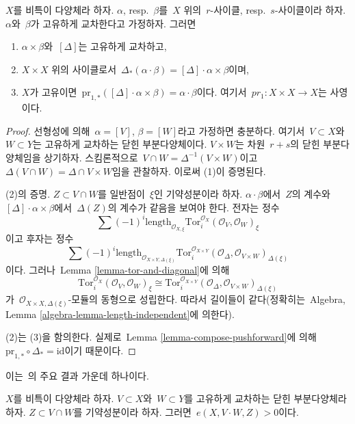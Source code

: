 \begin{lemma}
\label{lemma-reduction-diagonal}
$X$를 비특이 다양체라 하자. $\alpha$, resp.\ $\beta$를\  $X$ 위의\ 
$r$-사이클, resp.\ $s$-사이클이라 하자. $\alpha$와\  $\beta$가 고유하게
교차한다고 가정하자. 그러면
\begin{enumerate}
\item $\alpha \times \beta$와\  $[\Delta]$는 고유하게 교차하고,
\item $X \times X$ 위의 사이클로서\ 
$\Delta_*(\alpha \cdot \beta) = [\Delta] \cdot \alpha\times\beta$이며,
\item $X$가 고유이면\ 
$\text{pr}_{1, *}([\Delta] \cdot \alpha\times\beta) = \alpha\cdot\beta$이다.
여기서\  $pr_1 : X\times X \to X$는 사영이다.
\end{enumerate}
\end{lemma}

\begin{proof}
선형성에 의해\  $\alpha = [V]$, $\beta = [W]$라고 가정하면 충분하다.
여기서\  $V \subset X$와\  $W \subset Y$는 고유하게 교차하는 닫힌
부분다양체이다. $V \times W$는 차원\  $r + s$의 닫힌 부분다양체임을
상기하자. 스킴론적으로\ 
$V \cap W = \Delta^{-1}(V \times W)$이고\ 
$\Delta(V \cap W) = \Delta \cap V \times W$임을 관찰하자.
이로써 (1)이 증명된다.

\medskip\noindent
(2)의 증명. $Z \subset V \cap W$를 일반점이\  $\xi$인 기약성분이라 하자.
$\alpha \cdot \beta$에서\  $Z$의 계수와\ 
$[\Delta] \cdot \alpha \times \beta$에서\  $\Delta(Z)$의 계수가 같음을
보여야 한다. 전자는 정수
$$
\sum (-1)^i
\text{length}_{\mathcal{O}_{X, \xi}}
\text{Tor}_i^{\mathcal{O}_X}(\mathcal{O}_V, \mathcal{O}_W)_\xi
$$
이고 후자는 정수
$$
\sum (-1)^i
\text{length}_{\mathcal{O}_{X \times Y, \Delta(\xi)}}
\text{Tor}_i^{\mathcal{O}_{X \times Y}}(
\mathcal{O}_\Delta, \mathcal{O}_{V \times W})_{\Delta(\xi)}
$$
이다. 그러나\  Lemma \ref{lemma-tor-and-diagonal}에 의해
$$
\text{Tor}_i^{\mathcal{O}_X}(\mathcal{O}_V, \mathcal{O}_W)_\xi \cong
\text{Tor}_i^{\mathcal{O}_{X \times Y}}(
\mathcal{O}_\Delta, \mathcal{O}_{V \times W})_{\Delta(\xi)}
$$
가\  $\mathcal{O}_{X \times X, \Delta(\xi)}$-모듈의 동형으로 성립한다.
따라서 길이들이 같다(정확히는\  Algebra, Lemma
\ref{algebra-lemma-length-independent}에 의한다).

\medskip\noindent
(2)는 (3)을 함의한다. 실제로\  Lemma \ref{lemma-compose-pushforward}에 의해\ 
$\text{pr}_{1, *} \circ \Delta_* = \text{id}$이기 때문이다.
\end{proof}

\begin{proposition}
\label{proposition-positivity}
\begin{reference}
이는\  \cite{Serre_algebre_locale}의 주요 결과 가운데 하나이다.
\end{reference}
$X$를 비특이 다양체라 하자. $V \subset X$와\ 
$W \subset Y$를 고유하게 교차하는 닫힌 부분다양체라 하자.
$Z \subset V \cap W$를 기약성분이라 하자. 그러면\ 
$e(X, V \cdot W, Z) > 0$이다.
\end{proposition}

